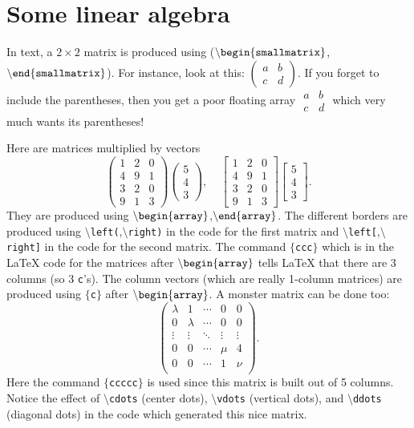 \documentclass[12pt,letterpaper]{amsart}
\newcommand{\latex}{\LaTeX}
\newcommand{\sm}{\setminus}
\newcommand{\pln}[1]{$\sm${\tt #1}}
\newcommand{\bgn}[1]{$\tt {\sm}begin\{#1\}$}
\newcommand{\nd}[1]{$\tt {\sm}end\{#1\}$}
\theoremstyle{plain}
\theoremstyle{definition}
\numberwithin{equation}{section}
\begin{document}
\section{Some linear algebra}\label{linalgsec}


In text, a $2 \times 2$ matrix is produced 
using (\bgn{smallmatrix},\nd{smallmatrix}).
For instance, look at this: 
$(\begin{smallmatrix}a&b\\c&d\end{smallmatrix})$. 
If you forget to include the parentheses, then you 
get a poor floating array $\begin{smallmatrix}a&b\\c&d\end{smallmatrix}$ 
which very much wants its parentheses!

Here are matrices multiplied by vectors
$$
\left(
\begin{array}{ccc}
1 & 2 & 0 \\
4 & 9 & 1 \\
3 & 2 & 0 \\
9 & 1 & 3 
\end{array}
\right)
\left(
\begin{array}{c}
5 \\ 4 \\ 3 
\end{array}
\right), 
\ \ \ \ \ 
\left[
\begin{array}{ccc}
1 & 2 & 0 \\
4 & 9 & 1 \\
3 & 2 & 0 \\
9 & 1 & 3 
\end{array}
\right]
\left[
\begin{array}{c}
5 \\ 4 \\ 3 
\end{array}
\right].
$$
They are produced using 
\bgn{array},\nd{array}.
The different borders are produced using 
\pln{left(},\pln{right)} in the code for the first matrix and 
\pln{left[},\pln{right]} in the code for the second matrix. 
The command {\tt $\{$ccc$\}$}
which is in the \latex{} 
code for the matrices after \bgn{array}
tells \latex{} that there are 3 columns (so 3 {\tt c}'s). 
The column vectors (which are really 1-column matrices) 
are produced using {\tt $\{$c$\}$} after 
\bgn{array}.
A monster matrix can be done too:
$$
\left(
\begin{array}{ccccc}
\lambda & 1 & \cdots & 0 & 0 \\
0 & \lambda & \cdots & 0 & 0 \\
\vdots & \vdots & \ddots & \vdots & \vdots\\
0 & 0 & \cdots & \mu & 4 \\
0 & 0 & \cdots & 1 & \nu \\
\end{array}
\right).
$$
Here the command 
{\tt $\{$ccccc$\}$} is used since this matrix is built out of 
5 columns.
Notice the effect of \pln{cdots} (center dots), 
\pln{vdots} (vertical dots), and \pln{ddots} (diagonal dots) 
in the code which generated this nice matrix. 
\end{document}
